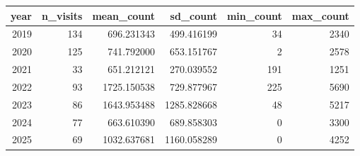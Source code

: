 \begin{tabular}{rrrrrr}
\toprule
year & n\_visits & mean\_count & sd\_count & min\_count & max\_count \\
\midrule
2019 & 134 & 696.231343 & 499.416199 & 34 & 2340 \\
2020 & 125 & 741.792000 & 653.151767 & 2 & 2578 \\
2021 & 33 & 651.212121 & 270.039552 & 191 & 1251 \\
2022 & 93 & 1725.150538 & 729.877967 & 225 & 5690 \\
2023 & 86 & 1643.953488 & 1285.828668 & 48 & 5217 \\
2024 & 77 & 663.610390 & 689.858303 & 0 & 3300 \\
2025 & 69 & 1032.637681 & 1160.058289 & 0 & 4252 \\
\bottomrule
\end{tabular}

